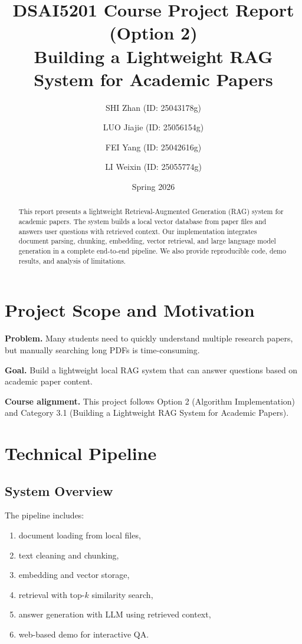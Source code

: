 \documentclass[11pt,a4paper]{article}
\title{\textbf{DSAI5201 Course Project Report (Option 2)}\\
Building a Lightweight RAG System for Academic Papers}
\author{
SHI Zhan (ID: 25043178g) \and
LUO Jiajie (ID: 25056154g) \and
FEI Yang (ID: 25042616g) \and
LI Weixin (ID: 25055774g)
}
\date{Spring 2026}
\begin{document}
\maketitle

\begin{abstract}
This report presents a lightweight Retrieval-Augmented Generation (RAG) system for academic papers.
The system builds a local vector database from paper files and answers user questions with retrieved context.
Our implementation integrates document parsing, chunking, embedding, vector retrieval, and large language model generation in a complete end-to-end pipeline.
We also provide reproducible code, demo results, and analysis of limitations.
\end{abstract}

\section{Project Scope and Motivation}
\textbf{Problem.}
Many students need to quickly understand multiple research papers, but manually searching long PDFs is time-consuming.

\textbf{Goal.}
Build a lightweight local RAG system that can answer questions based on academic paper content.

\textbf{Course alignment.}
This project follows Option 2 (Algorithm Implementation) and Category 3.1 (Building a Lightweight RAG System for Academic Papers).

\section{Technical Pipeline}
\subsection{System Overview}
The pipeline includes:
\begin{enumerate}[leftmargin=1.4em]
  \item document loading from local files,
  \item text cleaning and chunking,
  \item embedding and vector storage,
  \item retrieval with top-$k$ similarity search,
  \item answer generation with LLM using retrieved context,
  \item web-based demo for interactive QA.
\end{enumerate}
\end{document}
